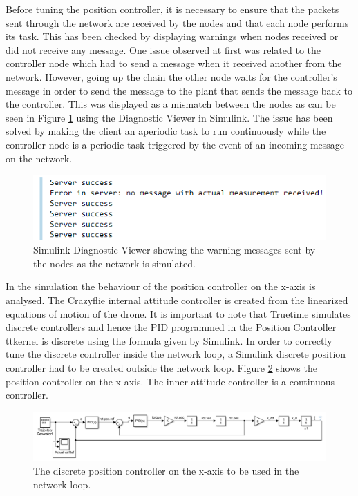 Before tuning the position controller, it is necessary to ensure that the packets sent through the network are received by the nodes and that each node performs its task. This has been checked by displaying warnings when nodes received or did not receive any message. One issue observed at first was related to the controller node which had to send a message when it received another from the network. However, going up the chain the other node waits for the controller's message in order to send the message to the plant that sends the message back to the controller. This was displayed as a mismatch between the nodes as can be seen in Figure \ref{figure:success} using the Diagnostic Viewer in Simulink. The issue has been solved by making the client an aperiodic task to run continuously while the controller node is a periodic task triggered by the event of an incoming message on the network.\\

\begin{figure}[H]
\centering
 \includegraphics[scale=0.8]{Figures/diagnostic_viewer.png}
 \caption{Simulink Diagnostic Viewer showing the warning messages sent by the nodes as the network is simulated.}
 \label{figure:success}
\end{figure}

In the simulation the behaviour of the position controller on the x-axis is analysed. The Crazyflie internal attitude controller is created from the linearized equations of motion of the drone. It is important to note that Truetime simulates discrete controllers and hence the PID programmed in the Position Controller ttkernel is discrete using the formula given by Simulink. In order to correctly tune the discrete controller inside the network loop, a Simulink discrete position controller had to be created outside the network loop. Figure \ref{figure:discrete_controller} shows the position controller on the x-axis. The inner attitude controller is a continuous controller. 

\begin{figure}[H]
\centering
 \includegraphics[scale=0.6]{Figures/pos_contr_simulink.png}
 \caption{The discrete position controller on the x-axis to be used in the network loop.}
 \label{figure:discrete_controller}
\end{figure}

